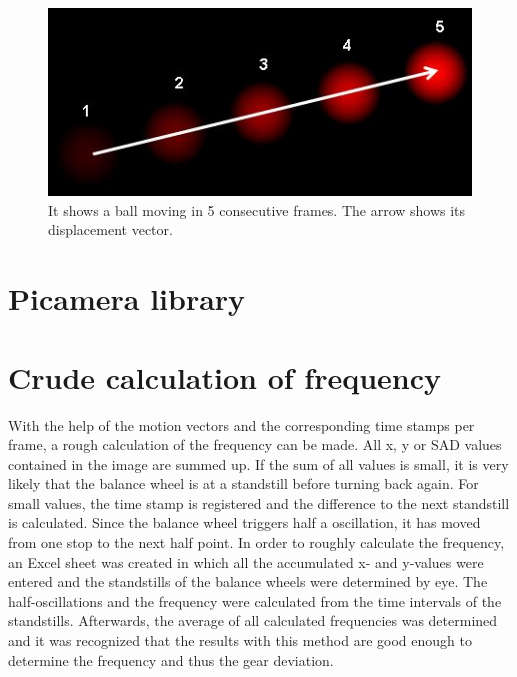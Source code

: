 \documentclass[12pt, a4paper]{report}
\begin{document}
\bigskip
\noindent
\begin{figure}
\centering
\includegraphics[scale=0.3]{Images/optical_flow_basic1.jpg}

\caption{It shows a ball moving in 5 consecutive frames. The arrow shows its displacement vector.}
\end{figure}


\bigskip

\section{Picamera library}

\section{Crude calculation of frequency}
With the help of the motion vectors and the corresponding time stamps per frame, a rough calculation of the frequency can be made. All x, y or SAD values contained in the image are summed up. If the sum of all values is small, it is very likely that the balance wheel is at a standstill before turning back again. For small values, the time stamp is registered and the difference to the next standstill is calculated. Since the balance wheel triggers half a oscillation, it has moved from one stop to the next half point. 
In order to roughly calculate the frequency, an Excel sheet was created in which all the accumulated x- and y-values were entered and the standstills of the balance wheels were determined by eye. The half-oscillations and the frequency were calculated from the time intervals of the standstills. Afterwards, the average of all calculated frequencies was determined and it was recognized that the results with this method are good enough to determine the frequency and thus the gear deviation. 
\end{document}
